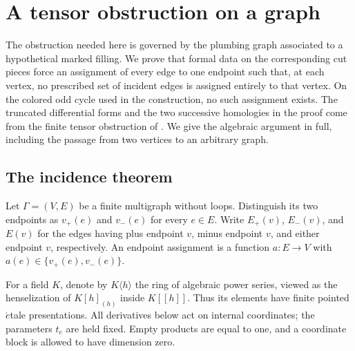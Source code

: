 \section{A tensor obstruction on a graph}\label{sec:tensors}

The obstruction needed here is governed by the plumbing graph associated
to a hypothetical marked filling.  We prove that formal data on the
corresponding cut pieces force an assignment of every edge to one endpoint
such that, at each vertex, no prescribed set of incident edges is assigned
entirely to that vertex.  On the colored odd cycle used in the construction,
no such assignment exists.  The truncated differential forms and the two
successive homologies in the proof come from the finite tensor obstruction of
\cite[Section~3]{MT}.  We give the algebraic argument in full, including the
passage from two vertices to an arbitrary graph.

\subsection{The incidence theorem}

Let \(\Gamma=(V,E)\) be a finite multigraph without loops.  Distinguish its
two endpoints as \(v_+(e)\) and \(v_-(e)\) for every \(e\in E\).  Write
\(E_+(v)\), \(E_-(v)\), and \(E(v)\) for the edges having plus endpoint
\(v\), minus endpoint \(v\), and either endpoint \(v\), respectively.
An endpoint assignment is a function \(a:E\to V\) with
\(a(e)\in\{v_+(e),v_-(e)\}\).

For a field \(K\), denote by \(K\langle h\rangle\) the ring of algebraic
power series, viewed as the henselization of \(K[h]_{(h)}\) inside
\(K[[h]]\).  Thus its elements have finite pointed \(\acute{e}\)tale
presentations.  All derivatives below act on internal coordinates; the
parameters \(t_e\) are held fixed.  Empty products are equal to one, and a
coordinate block is allowed to have dimension zero.

